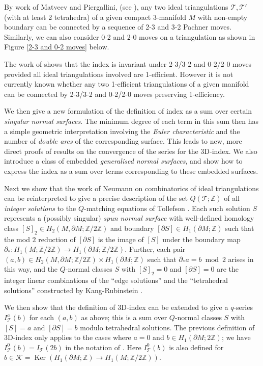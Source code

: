 \documentclass[12pt,reqno]{amsart}  %
\theoremstyle{definition}
\theoremstyle{remark}
\newcommand{\CT}{\mathcal{T}}
\newcommand{\T}{\mathcal{T}}
\def\Z{\mathbb Z}
\def\bd{\partial}
\DeclareMathOperator{\Ker}{Ker}
\begin{document}
By work of Matveev and Piergallini, (see \cite{Ma1, Ma2, Pi, Petronio}), 
any two ideal triangulations $\CT, \CT'$ (with at least 2 tetrahedra) 
of a given compact 3-manifold $M$ with non-empty boundary can be connected 
by a sequence of 2-3 and 3-2 Pachner moves. 
Similarly, we can also consider 0-2 and 2-0 moves on a triangulation as 
shown in Figure \ref{2-3 and 0-2 moves} below.

The work of \cite{Gar,GHRS} shows that the index is invariant under 
2-3/3-2 and 0-2/2-0 moves provided all ideal triangulations involved are 
1-efficient. However it is not currently known whether any two 1-efficient 
triangulations of a given manifold can be connected by 2-3/3-2 and 
0-2/2-0 moves preserving 1-efficiency. 

We then give a new formulation of the definition of index as a sum over 
certain \emph{singular normal surfaces}. The minimum degree of each term 
in this sum then has a simple geometric interpretation involving the 
\emph{Euler characteristic} and the number of \emph{double arcs} of the 
corresponding surface. This leads to new, more direct proofs of results on
the convergence of the series for the 3D-index. We also introduce a class 
of embedded \emph{generalised normal surfaces}, and show how to express the 
index as a sum over terms corresponding to these embedded surfaces.

Next we show that the work of Neumann \cite{N} on combinatorics of ideal 
triangulations can be reinterpreted to give a precise description of the 
set $Q(\T;\Z)$ of all {\em integer solutions} to the $Q$-matching equations 
of Tollefson \cite{To}. Each such solution $S$ represents a 
(possibly singular) \emph{spun normal surface} \cite{KR1,Ti} with 
well-defined homology class $[S]_2  \in H_2(M,\bd M;\Z/2\Z)$ and boundary 
$[\bd S] \in H_1(\bd M;\Z)$ such that the mod $2$ reduction of $[\bd S]$ is
the image of $[S]$ under the boundary map 
$\bd_* : H_1(M;\Z/2\Z) \to H_1(\bd M;\Z/2\Z)$. Further, each pair 
$(a,b) \in H_2(M,\bd M;\Z/2\Z) \times  H_1(\bd M;\Z)$ such that 
$\bd_* a = b \bmod 2$ arises in this way, and the $Q$-normal classes $S$ with 
$[S]_2=0$ and $[\bd S]=0$ are the integer linear combinations of the 
``edge solutions'' and the ``tetrahedral solutions'' constructed by 
Kang-Rubinstein \cite{KR1}.

We then show that the definition of 3D-index can be extended to give a 
$q$-series $I^a_\CT(b)$ for each $(a,b)$ as above; this is a sum over 
$Q$-normal classes $S$ with $[S]=a$ and $[\bd S]=b$ modulo tetrahedral 
solutions. The previous definition of 3D-index only applies to the cases 
where $a=0$ and $b \in H_1(\bd M; 2 \Z)$; we have $I^0_\CT(b) = I_\CT(2b)$ 
in the notation of \cite{GHRS}. Here $I^0_\T(b)$ is also defined for 
$b \in  {\mathcal K} = \Ker\left(H_1(\bd M; \Z) \to H_1(M;\Z/2\Z)\right)$.
\end{document}
